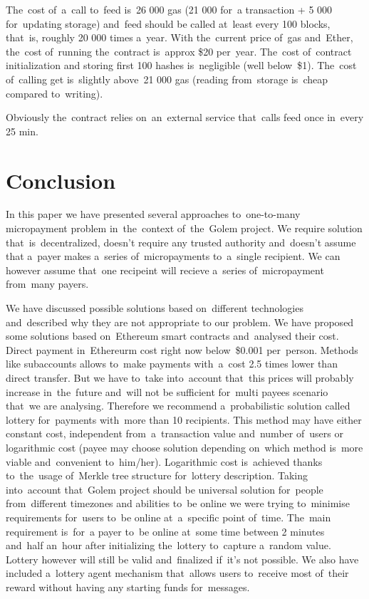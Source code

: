 \documentclass[a4paper]{article}
\begin{document}
    The~cost of~a~call to~feed is~26 000 gas (21 000 for~a transaction + 5 000 for~updating storage) and~feed should
    be called at~least every 100 blocks, that~is, roughly 20 000 times a~year. With the~current price of~gas
    and~Ether, the~cost of~running the~contract is~approx \$20 per~year. The~cost of~contract initialization and
    storing first 100 hashes is~negligible (well below~\$1). The~cost of~calling get is~slightly above~21 000 gas
    (reading from~storage is~cheap compared to~writing).

    Obviously the~contract relies on~an~external service that~calls feed once in~every 25 min.

\section{Conclusion}
    In this paper we have presented several approaches to~one-to-many micropayment problem in~the~context of~the~Golem
    project. We require solution that~is~decentralized, doesn't require any trusted authority and~doesn't assume that
    a~payer makes a~series of~micropayments to~a~single recipient. We can however assume that~one recipeint will
    recieve a~series of~micropayment  from~many payers.

    We have discussed possible solutions based on~different technologies and~described why they are not appropriate to
    our problem. We have proposed some solutions based on~Ethereum smart contracts and~analysed their cost.
    Direct payment in~Ethereurm cost right now below~\$0.001 per~person. Methods like  subaccounts allows to~make
    payments with~a~cost 2.5 times lower than direct transfer. But we have to~take into~account that~this prices will
    probably increase in~the~future and~will not be sufficient for~multi payees scenario that~we are analysing.
    Therefore we recommend a~probabilistic solution called lottery for~payments with~more than 10 recipients.
    This method may have either constant cost, independent from~a~transaction value and~number of~users or logarithmic
    cost (payee may choose solution depending on~which method is~more viable and~convenient to~him/her). Logarithmic
    cost is~achieved thanks to~the~usage of~Merkle tree structure for~lottery description.
    Taking into~account that~Golem project should be universal solution for~people from~different timezones and
    abilities to~be online we were trying to~minimise requirements for~users to~be online at~a~specific point of~time.
    The~main requirement is~for~a payer to~be online at~some time between 2 minutes and~half an~hour after initializing
    the~lottery to~capture a~random value. Lottery however will still be valid and~finalized if~it's not possible.
    We also have included a~lottery agent mechanism that~allows users to~receive most of~their reward without having
    any starting funds for~messages.
\end{document}
